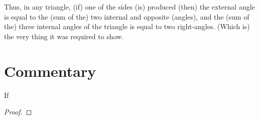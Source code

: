 Thus, in any triangle,  (if) one of the sides  (is) produced (then) the external
angle is equal to the (sum of the) two internal and opposite (angles), and the (sum of the) three
internal angles of the triangle is equal to two right-angles. (Which is)
the very thing it was required to show.


\section*{Commentary}

\begin{proposition}\label{proposition_32}\leanok
    If
\end{proposition}
\begin{proof}
    \leanok
\end{proof}
